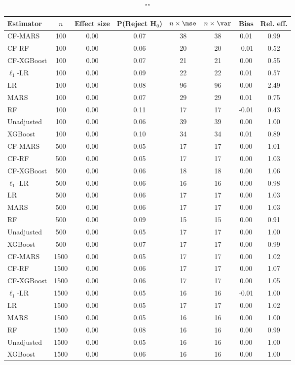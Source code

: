 \begin{table}
\centering
\caption{""}
\begin{tabular}{lccccccc}
\toprule
Estimator & $n$ & Effect size & P(Reject H$_0$) & $n\times\mse$ & $n\times \var$ & Bias & Rel. eff.\\ \midrule
CF-MARS & 100 & 0.00 & 0.07 & 38 & 38 &  0.01 & 0.99 \\ 
CF-RF & 100 & 0.00 & 0.06 & 20 & 20 & -0.01 & 0.52 \\ 
CF-XGBoost & 100 & 0.00 & 0.07 & 21 & 21 &  0.00 & 0.55 \\ 
$\ell_1$-LR & 100 & 0.00 & 0.09 & 22 & 22 &  0.01 & 0.57 \\ 
LR & 100 & 0.00 & 0.08 & 96 & 96 &  0.00 & 2.49 \\ 
MARS & 100 & 0.00 & 0.07 & 29 & 29 &  0.01 & 0.75 \\ 
RF & 100 & 0.00 & 0.11 & 17 & 17 & -0.01 & 0.43 \\ 
Unadjusted & 100 & 0.00 & 0.06 & 39 & 39 &  0.00 & 1.00 \\ 
XGBoost & 100 & 0.00 & 0.10 & 34 & 34 &  0.01 & 0.89 \\ \addlinespace 
CF-MARS & 500 & 0.00 & 0.05 & 17 & 17 &  0.00 & 1.01 \\ 
CF-RF & 500 & 0.00 & 0.05 & 17 & 17 &  0.00 & 1.03 \\ 
CF-XGBoost & 500 & 0.00 & 0.06 & 18 & 18 &  0.00 & 1.06 \\ 
$\ell_1$-LR & 500 & 0.00 & 0.06 & 16 & 16 &  0.00 & 0.98 \\ 
LR & 500 & 0.00 & 0.06 & 17 & 17 &  0.00 & 1.03 \\ 
MARS & 500 & 0.00 & 0.06 & 17 & 17 &  0.00 & 1.03 \\ 
RF & 500 & 0.00 & 0.09 & 15 & 15 &  0.00 & 0.91 \\ 
Unadjusted & 500 & 0.00 & 0.05 & 17 & 17 &  0.00 & 1.00 \\ 
XGBoost & 500 & 0.00 & 0.07 & 17 & 17 &  0.00 & 0.99 \\ \addlinespace 
CF-MARS & 1500 & 0.00 & 0.05 & 17 & 17 &  0.00 & 1.02 \\ 
CF-RF & 1500 & 0.00 & 0.06 & 17 & 17 &  0.00 & 1.07 \\ 
CF-XGBoost & 1500 & 0.00 & 0.06 & 17 & 17 &  0.00 & 1.05 \\ 
$\ell_1$-LR & 1500 & 0.00 & 0.05 & 16 & 16 & -0.01 & 1.00 \\ 
LR & 1500 & 0.00 & 0.05 & 17 & 17 &  0.00 & 1.02 \\ 
MARS & 1500 & 0.00 & 0.05 & 16 & 16 &  0.00 & 1.00 \\ 
RF & 1500 & 0.00 & 0.08 & 16 & 16 &  0.00 & 0.99 \\ 
Unadjusted & 1500 & 0.00 & 0.05 & 16 & 16 &  0.00 & 1.00 \\ 
XGBoost & 1500 & 0.00 & 0.06 & 16 & 16 &  0.00 & 1.00 \\
\bottomrule
\end{tabular}
\end{table}

